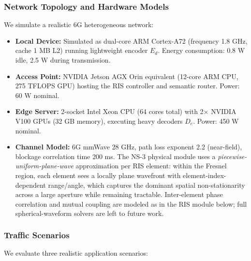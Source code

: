 \documentclass[journal]{IEEEtran}
\begin{document}
\subsubsection{Network Topology and Hardware Models}
We simulate a realistic 6G heterogeneous network:
\begin{itemize}
    \item \textbf{Local Device:} Simulated as dual-core ARM Cortex-A72 (frequency 1.8 GHz, cache 1 MB L2) running lightweight encoder $E_d$. Energy consumption: 0.8 W idle, 2.5 W during transmission.
    \item \textbf{Access Point:} NVIDIA Jetson AGX Orin equivalent (12-core ARM CPU, 275 TFLOPS GPU) hosting the RIS controller and semantic router. Power: 60 W nominal.
    \item \textbf{Edge Server:} 2-socket Intel Xeon CPU (64 cores total) with 2$\times$ NVIDIA V100 GPUs (32 GB memory), executing heavy decoders $D_e$. Power: 450 W nominal.
    \item \textbf{Channel Model:} 6G mmWave 28 GHz, path loss exponent 2.2 (near-field), blockage correlation time 200 ms. The NS-3 physical module uses a \emph{piecewise-uniform-plane-wave} approximation per RIS element: within the Fresnel region, each element sees a locally plane wavefront with element-index-dependent range/angle, which captures the dominant spatial non-stationarity across a large aperture while remaining tractable. Inter-element phase correlation and mutual coupling are modeled as in the RIS module below; full spherical-waveform solvers are left to future work.
\end{itemize}

\subsubsection{Traffic Scenarios}
We evaluate three realistic application scenarios:
\end{document}
